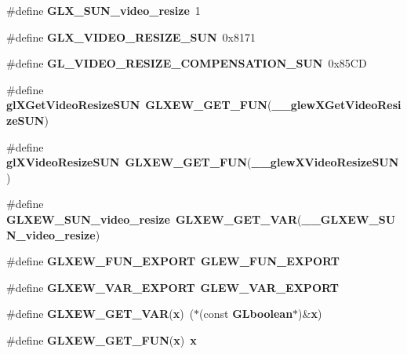 \begin{DoxyCompactItemize}
\#define {\bf G\+L\+X\+\_\+\+S\+U\+N\+\_\+video\+\_\+resize}~1
\item 
\#define {\bf G\+L\+X\+\_\+\+V\+I\+D\+E\+O\+\_\+\+R\+E\+S\+I\+Z\+E\+\_\+\+S\+UN}~0x8171
\item 
\#define {\bf G\+L\+\_\+\+V\+I\+D\+E\+O\+\_\+\+R\+E\+S\+I\+Z\+E\+\_\+\+C\+O\+M\+P\+E\+N\+S\+A\+T\+I\+O\+N\+\_\+\+S\+UN}~0x85\+CD
\item 
\#define {\bf gl\+X\+Get\+Video\+Resize\+S\+UN}~{\bf G\+L\+X\+E\+W\+\_\+\+G\+E\+T\+\_\+\+F\+UN}({\bf \+\_\+\+\_\+glew\+X\+Get\+Video\+Resize\+S\+UN})
\item 
\#define {\bf gl\+X\+Video\+Resize\+S\+UN}~{\bf G\+L\+X\+E\+W\+\_\+\+G\+E\+T\+\_\+\+F\+UN}({\bf \+\_\+\+\_\+glew\+X\+Video\+Resize\+S\+UN})
\item 
\#define {\bf G\+L\+X\+E\+W\+\_\+\+S\+U\+N\+\_\+video\+\_\+resize}~{\bf G\+L\+X\+E\+W\+\_\+\+G\+E\+T\+\_\+\+V\+AR}({\bf \+\_\+\+\_\+\+G\+L\+X\+E\+W\+\_\+\+S\+U\+N\+\_\+video\+\_\+resize})
\item 
\#define {\bf G\+L\+X\+E\+W\+\_\+\+F\+U\+N\+\_\+\+E\+X\+P\+O\+RT}~{\bf G\+L\+E\+W\+\_\+\+F\+U\+N\+\_\+\+E\+X\+P\+O\+RT}
\item 
\#define {\bf G\+L\+X\+E\+W\+\_\+\+V\+A\+R\+\_\+\+E\+X\+P\+O\+RT}~{\bf G\+L\+E\+W\+\_\+\+V\+A\+R\+\_\+\+E\+X\+P\+O\+RT}
\item 
\#define {\bf G\+L\+X\+E\+W\+\_\+\+G\+E\+T\+\_\+\+V\+AR}({\bf x})~($\ast$(const {\bf G\+Lboolean}$\ast$)\&{\bf x})
\item 
\#define {\bf G\+L\+X\+E\+W\+\_\+\+G\+E\+T\+\_\+\+F\+UN}({\bf x})~{\bf x}
\end{DoxyCompactItemize}
